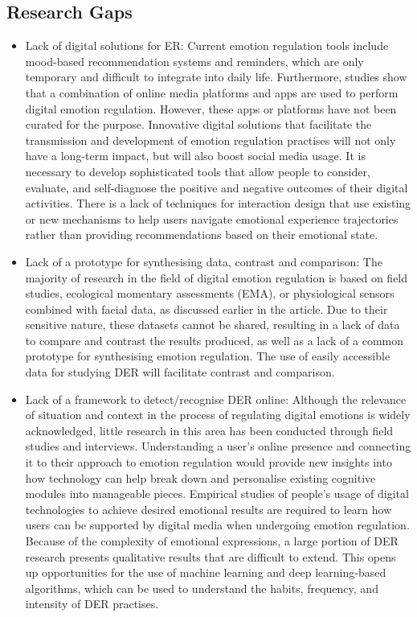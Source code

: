 \subsection{Research Gaps}
\begin{itemize}
    \item Lack of digital solutions for ER: Current emotion regulation tools include mood-based recommendation systems and reminders, which are only temporary and difficult to integrate into daily life. Furthermore, studies show that a combination of online media platforms and apps are used to perform digital emotion regulation. However, these apps or platforms have not been curated for the purpose. Innovative digital solutions that facilitate the transmission and development of emotion regulation practises will not only have a long-term impact, but will also boost social media usage. It is necessary to develop sophisticated tools that allow people to consider, evaluate, and self-diagnose the positive and negative outcomes of their digital activities. There is a lack of techniques for interaction design that use existing or new mechanisms to help users navigate emotional experience trajectories rather than providing recommendations based on their emotional state.
    \item Lack of a prototype for synthesising data, contrast and comparison: The majority of research in the field of digital emotion regulation is based on field studies, ecological momentary assessments (EMA), or physiological sensors combined with facial data, as discussed earlier in the article. Due to their sensitive nature, these datasets cannot be shared, resulting in a lack of data to compare and contrast the results produced, as well as a lack of a common prototype for synthesising emotion regulation. The use of easily accessible data for studying DER will facilitate contrast and comparison.
    \item Lack of a framework to detect/recognise DER online: Although the relevance of situation and context in the process of regulating digital emotions is widely acknowledged, little research in this area has been conducted through field studies and interviews. Understanding a user's online presence and connecting it to their approach to emotion regulation would provide new insights into how technology can help break down and personalise existing cognitive modules into manageable pieces. Empirical studies of people's usage of digital technologies to achieve desired emotional results are required to learn how users can be supported by digital media when undergoing emotion regulation. Because of the complexity of emotional expressions, a large portion of DER research presents qualitative results that are difficult to extend. This opens up opportunities for the use of machine learning and deep learning-based algorithms, which can be used to understand the habits, frequency, and intensity of DER practises.
\end{itemize}


